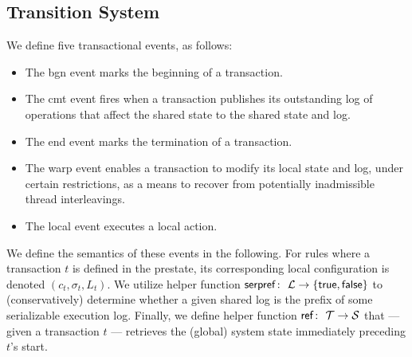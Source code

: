 \subsection{Transition System}
\label{sec:transitionsystem}

We define five transactional events, as follows:
\begin{itemize}
\item The {\sf bgn} event marks the beginning of a transaction.
\item The {\sf cmt} event fires when a transaction publishes its outstanding log of operations that affect the shared state to the shared state and log.
\item The {\sf end} event marks the termination of a transaction.
\item The {\sf warp} event enables a transaction to modify its local state and log, under certain restrictions, as a means to recover from potentially inadmissible thread interleavings.
\item The {\sf local} event executes a local action.
\end{itemize}
We define the semantics of these events in the following. For rules where a transaction $t$ is defined in the prestate, its corresponding local configuration is denoted $(c_t,\sigma_t,L_t)$. We utilize helper function ${\sf serpref} \colon\ {\cal L} \rightarrow \{ {\sf true},{\sf false} \}$ to (conservatively) determine whether a given shared log is the prefix of some serializable execution log. Finally, we define helper function
${\sf ref} \colon\ {\cal T} \rightarrow {\cal S}$ that --- given a transaction $t$ --- retrieves the (global) system state immediately preceding $t$'s start.


